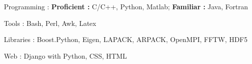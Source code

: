 


\begin{cvskills}


\cvskill
{Programming : } %
{\textbf{Proficient :}  C/C++, Python, Matlab; 
  \textbf{Familiar :} Java, Fortran} %

\cvskill
{Tools : }
{Bash, Perl, Awk, Latex}

\cvskill
{Libraries : }
{Boost.Python, Eigen, LAPACK, ARPACK, OpenMPI, FFTW, HDF5}


\cvskill
{Web : } %
{Django with Python, CSS, HTML} %




\end{cvskills}